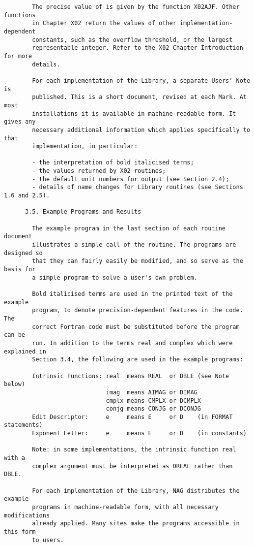 \begin{small}
\begin{verbatim}
        The precise value of is given by the function X02AJF. Other functions
        in Chapter X02 return the values of other implementation-dependent
        constants, such as the overflow threshold, or the largest
        representable integer. Refer to the X02 Chapter Introduction for more
        details.

        For each implementation of the Library, a separate Users' Note is
        published. This is a short document, revised at each Mark. At most
        installations it is available in machine-readable form. It gives any
        necessary additional information which applies specifically to that
        implementation, in particular:

        - the interpretation of bold italicised terms;
        - the values returned by X02 routines;
        - the default unit numbers for output (see Section 2.4);
        - details of name changes for Library routines (see Sections 1.6 and 2.5).

      3.5. Example Programs and Results

        The example program in the last section of each routine document
        illustrates a simple call of the routine. The programs are designed so
        that they can fairly easily be modified, and so serve as the basis for
        a simple program to solve a user's own problem.

        Bold italicised terms are used in the printed text of the example
        program, to denote precision-dependent features in the code. The
        correct Fortran code must be substituted before the program can be
        run. In addition to the terms real and complex which were explained in
        Section 3.4, the following are used in the example programs:

        Intrinsic Functions: real  means REAL  or DBLE (see Note below)
                             imag  means AIMAG or DIMAG
                             cmplx means CMPLX or DCMPLX
                             conjg means CONJG or DCONJG
        Edit Descriptor:     e     means E     or D    (in FORMAT statements)
        Exponent Letter:     e     means E     or D    (in constants)

        Note: in some implementations, the intrinsic function real with a
        complex argument must be interpreted as DREAL rather than DBLE.

        For each implementation of the Library, NAG distributes the example
        programs in machine-readable form, with all necessary modifications
        already applied. Many sites make the programs accessible in this form
        to users.


\end{verbatim}
\end{small}
